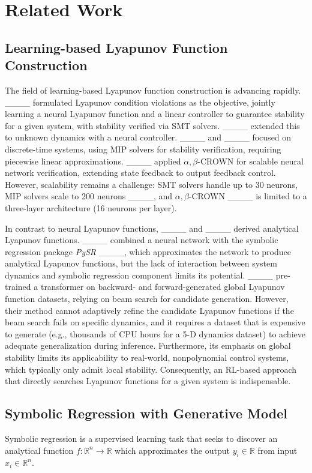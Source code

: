 \section{Related Work}
\subsection{Learning-based Lyapunov Function Construction}

The field of learning-based Lyapunov function construction is advancing rapidly. ____ formulated Lyapunov condition violations as the objective, jointly learning a neural Lyapunov function and a linear controller to guarantee stability for a given system, with stability verified via SMT solvers. ____ extended this to unknown dynamics with a neural controller. ____ and ____ focused on discrete-time systems, using MIP solvers for stability verification, requiring piecewise linear approximations. ____ applied $\alpha,\beta$-CROWN for scalable neural network verification, extending state feedback to output feedback control. However, scalability remains a challenge: SMT solvers handle up to 30 neurons, MIP solvers scale to 200 neurons ____, and $\alpha,\beta$-CROWN ____ is limited to a three-layer architecture (16 neurons per layer).


In contrast to neural Lyapunov functions, ____ and ____ derived analytical Lyapunov functions. ____ combined a neural network with the symbolic regression package \textit{PySR} ____, which approximates the network to produce analytical Lyapunov functions, but the lack of interaction between system dynamics and symbolic regression component limits its potential. ____ pre-trained a transformer on backward- and forward-generated global Lyapunov function datasets, relying on beam search for candidate generation. However, their method cannot adaptively refine the candidate Lyapunov functions if the beam search fails on specific dynamics, and it requires a dataset that is expensive to generate (e.g., thousands of CPU hours for a 5-D dynamics dataset) to achieve adequate generalization during inference. Furthermore, its emphasis on global stability limits its applicability to real-world, nonpolynomial control systems, which typically only admit local stability. Consequently, an RL-based approach that directly searches Lyapunov functions for a given system is indispensable.


\subsection{Symbolic Regression with Generative Model}
\label{subsec:sr-work}
Symbolic regression is a supervised learning task that seeks to discover an analytical function $f: \mathbb{R}^n \to \mathbb{R}$ which approximates the output $y_i \in \mathbb{R}$ from input $x_i \in \mathbb{R}^n$.



